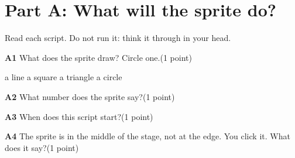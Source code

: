 \documentclass[level=1]{kidscode}
\newcommand{\qnum}[1]{\textbf{\color{kcaccent}#1}\quad}
\newcommand{\pts}[1]{\hfill{\small(#1)}}
\begin{document}
\section{Part A: What will the sprite do?}
Read each script. Do not run it: think it through in your head.

\begin{minipage}[t]{0.42\linewidth}
\begin{scratch}[scale=0.75]
\end{scratch}
\end{minipage}\hfill
\begin{minipage}[t]{0.55\linewidth}
\qnum{A1} What does the sprite draw? Circle one.\pts{1 point}\par\medskip
a line \qquad a square \qquad a triangle \qquad a circle
\end{minipage}

\bigskip{}
\begin{minipage}[t]{0.42\linewidth}
\begin{scratch}[scale=0.75]
\end{scratch}
\end{minipage}\hfill
\begin{minipage}[t]{0.55\linewidth}
\qnum{A2} What number does the sprite say?\pts{1 point}\par
{}
\end{minipage}

\bigskip{}
\begin{minipage}[t]{0.42\linewidth}
\begin{scratch}[scale=0.75]
  {}
  {}
\end{scratch}
\end{minipage}\hfill
\begin{minipage}[t]{0.55\linewidth}
\qnum{A3} When does this script start?\pts{1 point}\par
{}
\qnum{A4} The sprite is in the middle of the stage, not at the edge. You click it. What does it say?\pts{1 point}\par
{}
\end{minipage}
\end{document}
